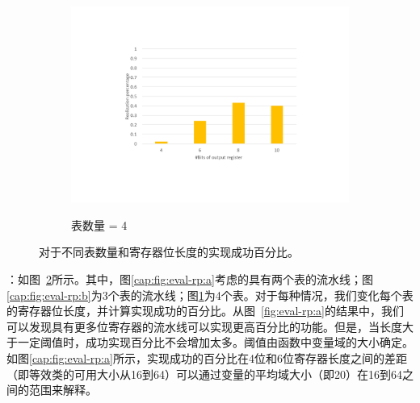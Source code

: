 \begin{figure}

  \begin{subfigure}[b]{0.4\textwidth}
      \includegraphics[width=\textwidth]{figures/figure-eval-rp-4.pdf}
      \label{cap:fig:eval-rp:c}
      \caption{表数量 = 4}
  \end{subfigure}

  \caption{对于不同表数量和寄存器位长度的实现成功百分比。}
  \label{cap:fig:eval-rp} %
\end{figure}

：如图~\ref{cap:fig:eval-rp}所示。其中，图\ref{cap:fig:eval-rp:a}考虑的具有两个表的流水线；图\ref{cap:fig:eval-rp:b}为3个表的流水线；图\ref{cap:fig:eval-rp:c}为4个表。对于每种情况，我们变化每个表的寄存器位长度，并计算实现成功的百分比。从图~\ref{fig:eval-rp:a}的结果中，我们可以发现具有更多位寄存器的流水线可以实现更高百分比的功能。但是，当长度大于一定阈值时，成功实现百分比不会增加太多。阈值由函数中变量域的大小确定。如图\ref{cap:fig:eval-rp:a}所示，实现成功的百分比在4位和6位寄存器长度之间的差距（即等效类的可用大小从16到64）可以通过变量的平均域大小（即20）在16到64之间的范围来解释。




